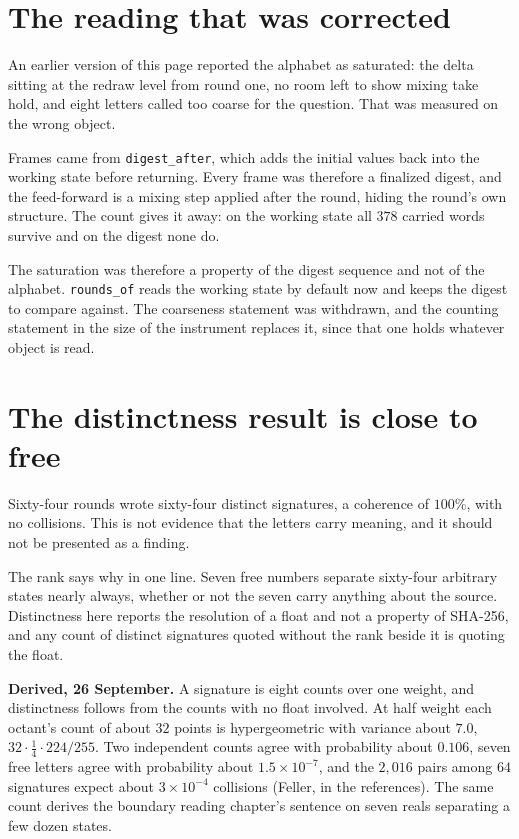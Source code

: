 \section{The reading that was corrected}

An earlier version of this page reported the alphabet as saturated: the delta sitting at the redraw level from round one, no room left to show mixing take hold, and eight letters called too coarse for the question. That was measured on the wrong object.

Frames came from \texttt{digest\_after}, which adds the initial values back into the working state before returning. Every frame was therefore a finalized digest, and the feed-forward is a mixing step applied after the round, hiding the round's own structure. The count gives it away: on the working state all \(378\) carried words survive and on the digest none do.

The saturation was therefore a property of the digest sequence and not of the alphabet. \texttt{rounds\_of} reads the working state by default now and keeps the digest to compare against. The coarseness statement was withdrawn, and the counting statement in the size of the instrument replaces it, since that one holds whatever object is read.

\section{The distinctness result is close to free}

Sixty-four rounds wrote sixty-four distinct signatures, a coherence of \(100\%\), with no collisions. This is not evidence that the letters carry meaning, and it should not be presented as a finding.

The rank says why in one line. Seven free numbers separate sixty-four arbitrary states nearly always, whether or not the seven carry anything about the source. Distinctness here reports the resolution of a float and not a property of SHA-256, and any count of distinct signatures quoted without the rank beside it is quoting the float.

\textbf{Derived, 26 September.} A signature is eight counts over one weight, and distinctness follows from the counts with no float involved. At half weight each octant's count of about \(32\) points is hypergeometric with variance about \(7.0\), \(32 \cdot \tfrac14 \cdot 224/255\). Two independent counts agree with probability about \(0.106\), seven free letters agree with probability about \(1.5 \times 10^{-7}\), and the \(2{,}016\) pairs among \(64\) signatures expect about \(3 \times 10^{-4}\) collisions (Feller, in the references). The same count derives the boundary reading chapter's sentence on seven reals separating a few dozen states.

